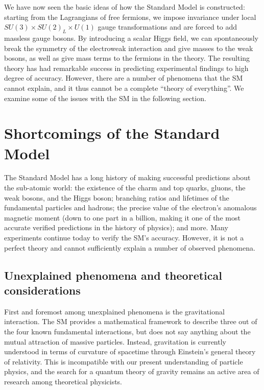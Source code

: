 We have now seen the basic ideas of how the Standard Model is constructed: starting from the Lagrangians
of free fermions, we impose invariance under local $SU(3)\times SU(2)_L\times U(1)$ gauge transformations
and are forced to add massless gauge bosons. By introducing a scalar Higgs field, we can spontaneously 
break the symmetry of the electroweak interaction and give masses to the weak bosons, as well as
give mass terms to the fermions in the theory. The resulting theory has had remarkable success in
predicting experimental findings to high degree of accuracy. However, there are a number of phenomena
that the SM cannot explain, and it thus cannot be a complete ``theory of everything''. We examine some
of the issues with the SM in the following section.


\section{Shortcomings of the Standard Model}
The Standard Model has a long history of making successful predictions about the sub-atomic
world: the existence of the charm and top quarks, gluons, the weak bosons, and the Higgs boson;
branching ratios and lifetimes of the fundamental particles and hadrons; the precise value of the
electron's anomalous magnetic moment (down to one part in a billion, making it one of the most accurate
verified predictions in the history of physics); and more. Many experiments continue today to verify the SM's
accuracy. However, it is not a perfect theory and cannot sufficiently explain a number of observed
phenomena.

\subsection{Unexplained phenomena and theoretical considerations}

First and foremost among unexplained phenomena is the gravitational interaction. 
The SM provides a mathematical framework to describe
three out of the four known fundamental interactions, but does not say anything about the mutual attraction
of massive particles. Instead, gravitation is currently understood in terms of curvature of spacetime
through Einstein's general theory of relativity. This is incompatible with our present understanding of
particle physics, and the search for a quantum theory of gravity remains an active area
of research among theoretical physicists.

